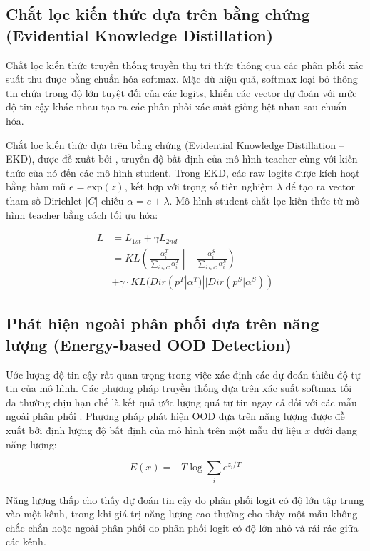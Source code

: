 \subsection{Chắt lọc kiến thức dựa trên bằng chứng (Evidential Knowledge Distillation)}
\label{sec:ekd}

Chắt lọc kiến thức truyền thống truyền thụ tri thức thông qua các phân phối xác suất thu được bằng chuẩn hóa softmax. Mặc dù hiệu quả, softmax loại bỏ thông tin chứa trong độ lớn tuyệt đối của các logits, khiến các vector dự đoán với mức độ tin cậy khác nhau tạo ra các phân phối xác suất giống hệt nhau sau chuẩn hóa.

Chắt lọc kiến thức dựa trên bằng chứng (Evidential Knowledge Distillation -- EKD), được đề xuất bởi \cite{xiang2025ekd}, truyền độ bất định của mô hình teacher cùng với kiến thức của nó đến các mô hình student. Trong EKD, các raw logits được kích hoạt bằng hàm mũ $e=\text{exp}(z)$, kết hợp với trọng số tiên nghiệm $\lambda$ để tạo ra vector tham số Dirichlet $|C|$ chiều $\alpha = e + \lambda$. Mô hình student chắt lọc kiến thức từ mô hình teacher bằng cách tối ưu hóa:

\begin{equation}
\label{ekd}
\begin{split}
L & = L_{1st} + \gamma L_{2nd} \\
  & = KL\left(\frac{\alpha_i^T}{\sum_{i \in C}\alpha_i^T} \middle|\middle| \frac{\alpha_i^S}{\sum_{i \in C}\alpha_i^S}\right) \\
  & +\gamma \cdot KL(Dir(p^T|\alpha^T)||Dir(p^S|\alpha^S))
\end{split}
\end{equation}

\subsection{Phát hiện ngoài phân phối dựa trên năng lượng (Energy-based OOD Detection)}
\label{sec:energy}

Ước lượng độ tin cậy rất quan trọng trong việc xác định các dự đoán thiếu độ tự tin của mô hình. Các phương pháp truyền thống dựa trên xác suất softmax tối đa thường chịu hạn chế là kết quả ước lượng quá tự tin ngay cả đối với các mẫu ngoài phân phối \cite{liu2020energy}. Phương pháp phát hiện OOD dựa trên năng lượng được đề xuất bởi \cite{liu2020energy} định lượng độ bất định của mô hình trên một mẫu dữ liệu $x$ dưới dạng năng lượng:

\begin{equation}
\label{energy}
E(x) = -T \log\sum_i e^{{z_i}/T}
\end{equation}

Năng lượng thấp cho thấy dự đoán tin cậy do phân phối logit có độ lớn tập trung vào một kênh, trong khi giá trị năng lượng cao thường cho thấy một mẫu không chắc chắn hoặc ngoài phân phối do phân phối logit có độ lớn nhỏ và rải rác giữa các kênh.

\pagebreak
